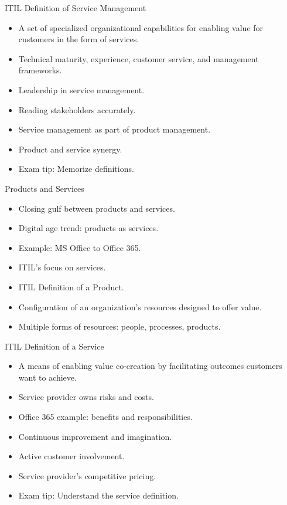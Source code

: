 \documentclass[aspectratio=169, table]{beamer}
\begin{document}
\begin{frame}{ITIL Definition of Service Management}
	\begin{itemize}
		\item A set of specialized organizational capabilities for enabling value for customers in the form of services.
		\item Technical maturity, experience, customer service, and management frameworks.
		\item Leadership in service management.
		\item Reading stakeholders accurately.
		\item Service management as part of product management.
		\item Product and service synergy.
		\item Exam tip: Memorize definitions.
	\end{itemize}
\end{frame}

\begin{frame}{Products and Services}
	\begin{itemize}
		\item Closing gulf between products and services.
		\item Digital age trend: products as services.
		\item Example: MS Office to Office 365.
		\item ITIL's focus on services.
		\item ITIL Definition of a Product.
		\item Configuration of an organization's resources designed to offer value.
		\item Multiple forms of resources: people, processes, products.
	\end{itemize}
\end{frame}

\begin{frame}{ITIL Definition of a Service}
	\begin{itemize}
		\item A means of enabling value co-creation by facilitating outcomes customers want to achieve.
		\item Service provider owns risks and costs.
		\item Office 365 example: benefits and responsibilities.
		\item Continuous improvement and imagination.
		\item Active customer involvement.
		\item Service provider's competitive pricing.
		\item Exam tip: Understand the service definition.
	\end{itemize}
\end{frame}
\end{document}
